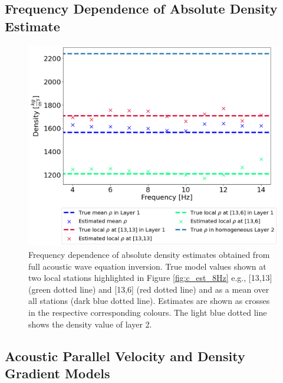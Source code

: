 \documentclass{article}
\begin{document}
	\subsection{Frequency Dependence of Absolute Density Estimate} \label{sec:APP_FREQ}
	\renewcommand{\theequation}{C\thesection\arabic{equation}}
	\setcounter{equation}{0}
	\renewcommand{\thefigure}{C\arabic{figure}}
	\setcounter{figure}{0} 
		\begin{figure}[H]
		\centering
		\includegraphics[width =0.55\linewidth]{../Figures/abs_rho_Freq.png}
		\captionsetup{width=\linewidth}
		\caption{Frequency dependence of absolute density estimates obtained from full acoustic wave equation inversion. True model values shown at two local stations highlighted in Figure \ref{fig:c_est_8Hz} e.g., [13,13] (green dotted line) and [13,6] (red dotted line) and as a mean over all stations (dark blue dotted line). Estimates are shown as crosses in the respective corresponding colours. The light blue dotted line shows the density value of layer 2. }
		\label{fig:abs_rho_FREQ}
		\end{figure}%
	
	\let\cleardoublepage\clearpage
	\subsection{Acoustic Parallel Velocity and Density Gradient Models} \label{sec:APP_D}
	\renewcommand{\theequation}{D\thesection\arabic{equation}}
	\setcounter{equation}{0}
	\renewcommand{\thefigure}{D\arabic{figure}}
	
\end{document}
